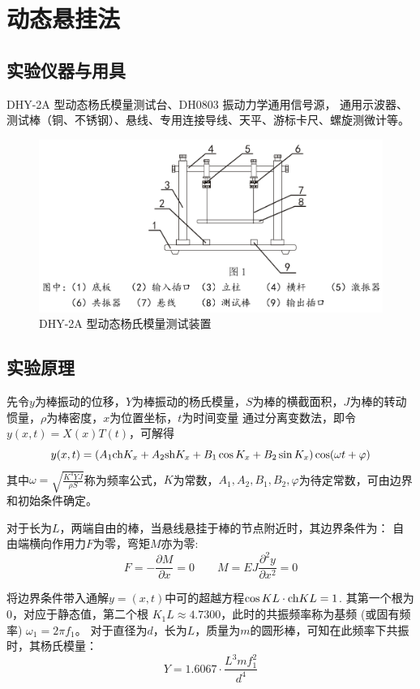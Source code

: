 \documentclass[UTF8]{article}
\theoremstyle{MyLineTheoremStyle} %
\theoremstyle{MyBlockTheoremStyle} %
\theoremstyle{MySubsubsectionStyle} %
\begin{document}
\section{动态悬挂法}
\subsection{实验仪器与用具}
DHY-2A 型动态杨氏模量测试台、DH0803 振动力学通用信号源，
通用示波器、
测试棒（铜、不锈钢）、悬线、专用连接导线、天平、游标卡尺、螺旋测微计等。

\begin{figure}[H]\centering
    \includegraphics[width=0.75\columnwidth]{assets/0/a36e12208fcd72455f93e4b950ef3249.png}
    \caption{DHY-2A 型动态杨氏模量测试装置}
\end{figure}

\subsection{实验原理}

先令$y$为棒振动的位移，$Y$为棒振动的杨氏模量，$S$为棒的横截面积，$J$为棒的转动惯量，$\rho$为棒密度，$x$为位置坐标，$t$为时间变量
通过分离变数法，即令$y(x,t)=X(x)T(t)$，可解得
\begin{equation}
    y(x,t)=\left(A_1{\rm ch}K_x+A_2{\rm sh}K_x+B_1\cos K_x+B_2\sin K_x \right)\cos (\omega t+\varphi)
\end{equation}
其中$\omega= \sqrt{\frac{K^4YJ}{\rho S}}$称为频率公式，$K$为常数，$A_1,A_2,B_1,B_2,\varphi$为待定常数，可由边界和初始条件确定。

对于长为$L$，两端自由的棒，当悬线悬挂于棒的节点附近时，其边界条件为：
自由端横向作用力$F$为零，弯矩$M$亦为零:
\begin{equation}
   F=-\frac{\partial M}{\partial x} =0\qquad 
   M=EJ\frac{\partial^2y}{\partial x^2}=0
\end{equation}

将边界条件带入通解$y=(x,t)$中可的超越方程$\cos KL\cdot {\rm ch}KL=1$.
其第一个根为$0$，对应于静态值，第二个根 $K_1L\approx 4.7300$，此时的共振频率称为基频 (或固有频率) $\omega_1=2\pi f_1$。
对于直径为$d$，长为$L$，质量为$m$的圆形棒，可知在此频率下共振时，其杨氏模量：
\begin{equation}\label{3}
   Y=1.6067 \cdot \frac{L^3mf_1^2}{d^4} 
\end{equation}
\end{document}
